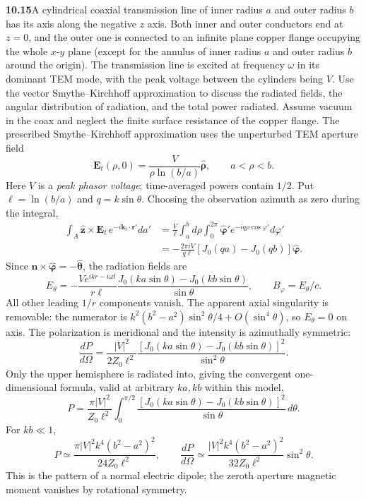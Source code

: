 \par\bigskip
\noindent\textbf{10.15}\quad A cylindrical coaxial transmission line of inner radius $a$ and outer radius $b$ has its axis along the negative $z$ axis. Both inner and outer conductors end at $z=0$, and the outer one is connected to an infinite plane copper flange occupying the whole $x$-$y$ plane (except for the annulus of inner radius $a$ and outer radius $b$ around the origin). The transmission line is excited at frequency $\omega$ in its dominant TEM mode, with the peak voltage between the cylinders being $V$. Use the vector Smythe--Kirchhoff approximation to discuss the radiated fields, the angular distribution of radiation, and the total power radiated.
\solution
Assume vacuum in the coax and neglect the finite surface resistance of
the copper flange. The prescribed Smythe--Kirchhoff approximation uses
the unperturbed TEM aperture field
\[
\mathbf E_t(\rho,0)=\frac{V}{\rho\ln(b/a)}\widehat{\boldsymbol\rho},
\qquad a<\rho<b.
\]
Here $V$ is a \emph{peak phasor voltage}; time-averaged powers contain
$1/2$. Put $\ell=\ln(b/a)$ and $q=k\sin\theta$. Choosing the observation
azimuth as zero during the integral,
\[
\begin{split}
\int_A\widehat{\mathbf z}\times\mathbf E_t\,
e^{-i\mathbf k_t\cdot\mathbf r'}da'
&=\frac{V}{\ell}\int_a^b d\rho\int_0^{2\pi}
\widehat{\boldsymbol\varphi}'e^{-iq\rho\cos\varphi'}d\varphi'\\
&=-\frac{2\pi iV}{q\ell}[J_0(qa)-J_0(qb)]
\widehat{\boldsymbol\varphi}.
\end{split}
\]
Since $\mathbf n\times\widehat{\boldsymbol\varphi}
=-\widehat{\boldsymbol\theta}$, the radiation fields are
\[
\boxed{E_\theta=-\frac{Ve^{ikr-i\omega t}}{r\ell}
\frac{J_0(ka\sin\theta)-J_0(kb\sin\theta)}{\sin\theta},
\qquad B_\varphi=E_\theta/c.}
\]
All other leading $1/r$ components vanish. The apparent axial singularity
is removable: the numerator is
$k^2(b^2-a^2)\sin^2\theta/4+O(\sin^4\theta)$, so $E_\theta=0$ on axis.
The polarization is meridional and the intensity is azimuthally symmetric:
\[
\boxed{\frac{dP}{d\Omega}=\frac{|V|^2}{2Z_0\ell^2}
\frac{[J_0(ka\sin\theta)-J_0(kb\sin\theta)]^2}{\sin^2\theta}.}
\]
Only the upper hemisphere is radiated into, giving the convergent
one-dimensional formula, valid at arbitrary $ka,kb$ within this model,
\[
\boxed{P=\frac{\pi|V|^2}{Z_0\ell^2}
\int_0^{\pi/2}
\frac{[J_0(ka\sin\theta)-J_0(kb\sin\theta)]^2}{\sin\theta}\,d\theta.}
\]
For $kb\ll1$,
\[
P\simeq\frac{\pi|V|^2 k^4(b^2-a^2)^2}{24Z_0\ell^2},
\qquad
\frac{dP}{d\Omega}\simeq
\frac{|V|^2 k^4(b^2-a^2)^2}{32Z_0\ell^2}\sin^2\theta .
\]
This is the pattern of a normal electric dipole; the zeroth aperture
magnetic moment vanishes by rotational symmetry.

